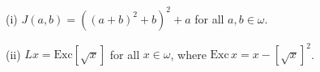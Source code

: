 (i) $J(a, b) = ((a + b)^2 + b)^2 + a$ for all $a, b \in \omega$.

(ii) $Lx = \text{Exc}[\sqrt{x}]$ for all $x \in \omega$, where $\text{Exc}\,x = x - [\sqrt{x}]^2$.
